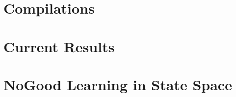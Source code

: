 \section[Compilations]{Compilations}
\subsection*{}

\begin{frame}{}

\end{frame}



%

\section[Results]{Current Results}
\subsection*{}

\begin{frame}{}

\end{frame}



%

\section[NoGood Learning]{NoGood Learning in State Space}
\subsection*{}

\begin{frame}{}

\end{frame}



